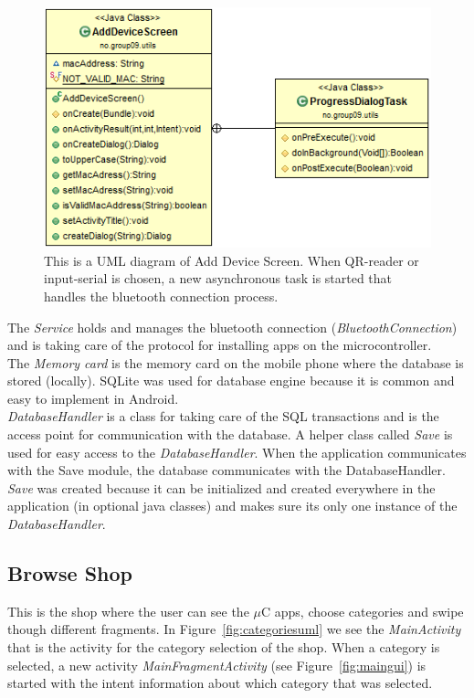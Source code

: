 	\begin{figure}[H]
	\centering
	\includegraphics[scale=0.85]{images/UML/adddevicescreen.png}
	\caption[UML - AddDeviceScreen]{This is a UML diagram of Add Device Screen. When QR-reader or input-serial is chosen, a new asynchronous task is started that handles the bluetooth connection process.}
	\label{fig:adddevicescreenuml}
	\end{figure}

	The \textit{Service} holds and manages the bluetooth connection (\textit{BluetoothConnection}) and is taking care of the protocol for installing apps on the microcontroller. \\

	The \textit{Memory card} is the memory card on the mobile phone where the database is stored (locally). SQLite was used for database engine because it is common and easy to implement in Android.\\

	\textit{DatabaseHandler} is a class for taking care of the SQL transactions and is the access point for communication with the database. A helper class called \textit{Save} is used for easy access to the \textit{DatabaseHandler}.
	When the application communicates with the Save module, the database communicates with the DatabaseHandler.
	\textit{Save} was created because it can be initialized and created everywhere in the application (in optional java classes) and makes sure its only one instance of the \textit{DatabaseHandler}.

	\subsection{Browse Shop}
	This is the shop where the user can see the $\mu$C apps, choose categories and swipe though different fragments. In  Figure~\ref{fig:categoriesuml} we see the \textit{MainActivity} that is the activity for the category selection of the shop. 
	When a category is selected, a new activity \textit{MainFragmentActivity} (see Figure~\ref{fig:maingui}) is started with the intent information about which category that was selected.

